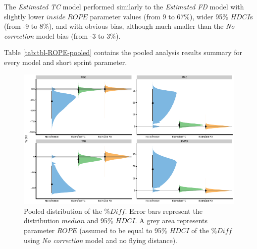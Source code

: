 \documentclass[fleqn,10pt]{wlpeerj} %
\begin{document}
The \emph{Estimated TC} model performed similarly to the \emph{Estimated FD} model with slightly lower \(inside \; ROPE\) parameter values (from 9 to 67\%), wider 95\% \(HDCI\)s (from -9 to 8\%), and with obvious bias, although much smaller than the \emph{No correction} model bias (from -3 to 3\%).

Table \ref{tab:tbl-ROPE-pooled} contains the pooled analysis results summary for every model and short sprint parameter.



\begin{figure}

{\centering \includegraphics[width=0.9\linewidth]{shorts-simulation-paper_files/figure-latex/graph-ROPE-pooled-1} 

}

\caption{Pooled distribution of the \(\%Diff\). Error bars represent the distribution \(median\) and 95\% \(HDCI\). A grey area represents parameter \(ROPE\) (assumed to be equal to 95\% \(HDCI\) of the \(\%Diff\) using \emph{No correction} model and no flying distance).}\label{fig:graph-ROPE-pooled}
\end{figure}
\end{document}
